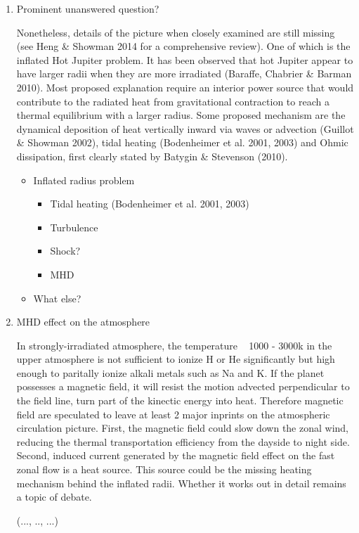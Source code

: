 \documentclass[11pt]{article}
\begin{document}
\begin{enumerate}
\item Prominent unanswered question?

Nonetheless, details of the picture when closely examined are still missing  (see Heng \& Showman 2014 for a comprehensive review). One of which is the inflated Hot Jupiter  problem. It has been observed that hot Jupiter appear to have larger radii when they are more irradiated (Baraffe, Chabrier \& Barman 2010). Most proposed explanation require an interior power source that would contribute to the radiated heat from gravitational contraction to reach a thermal equilibrium with a larger radius. 
Some proposed mechanism are the dynamical deposition of heat vertically inward via waves or advection (Guillot \& Showman 2002), tidal heating (Bodenheimer et al. 2001, 2003) and Ohmic dissipation, first clearly stated by Batygin \& Stevenson (2010).  


\begin{itemize}
\item Inflated radius problem
\begin{itemize}
\item Tidal heating (Bodenheimer et al. 2001, 2003)
\item Turbulence
\item Shock?
\item MHD
\end{itemize}
\item What else?
\end{itemize}

\item MHD effect on the atmosphere

In strongly-irradiated atmosphere, the temperature ~ 1000 - 3000k in the upper atmosphere is not sufficient to ionize H or He significantly but high enough to paritally ionize alkali metals such as Na and K. If the planet possesses a magnetic field, it will resist the motion advected perpendicular to the field line, turn part of the kinectic energy into heat. Therefore magnetic field are speculated to leave at least 2 major inprints on the atmospheric circulation picture. First, the magnetic field could slow down the zonal wind, reducing the thermal transportation efficiency from the dayside to night side. Second, induced current generated by the magnetic field effect on the fast zonal flow is a heat source.  This source could be the missing heating mechanism behind the inflated radii. Whether it works out in detail remains a topic of debate. 

(..., .., ...)


\end{enumerate}
\end{document}
